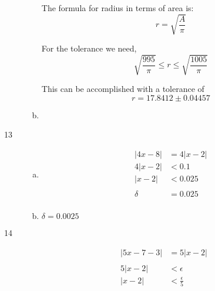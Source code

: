 \documentclass[letterpaper, landscape]{exam}
\begin{document}
\begin{description}
\begin{enumerate}[(a)]
            The formula for radius in terms of area is:
            \[
              r = \sqrt{\frac{A}{\pi}}
            \]

            For the tolerance we need, 
            \[
              \sqrt{\frac{995}{\pi}} \leq r \leq \sqrt{\frac{1005}{\pi}}
            \]

            This can be accomplished with a tolerance of 
            \[
              r = 17.8412 \pm \boxed{ 0.04457 }
            \]

          \item 
        \end{enumerate}

      \item[13]
        \begin{enumerate}[(a)]
          \item 
            \begin{align*}
              |4x - 8|    & = 4 |x - 2| \\
              4 | x - 2 | & < 0.1 \\
              |x - 2|     & < 0.025 \\
              \\
              \delta      & = \boxed{ 0.025 } \\
            \end{align*}

          \item $\delta = \boxed{ 0.0025 }$ 
        \end{enumerate}

      \item[14]
        \begin{align*}
          |5x - 7 - 3| & = 5 |x - 2| \\
          \\
          5 | x - 2 |  & < \epsilon \\
          |x - 2|      & < \frac{\epsilon}{5} \\
        \end{align*}


\end{description}
\end{document}
